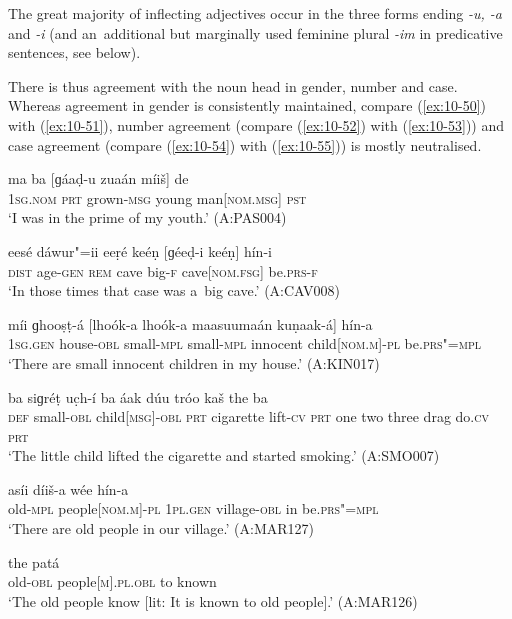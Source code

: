 The great majority of inflecting adjectives occur in the three forms ending \textit{-u, -a} and \textit{-i} (and an~additional but marginally used feminine plural \textit{-im} in predicative sentences, see  below).


There is thus agreement with the noun head in gender, number and case. Whereas agreement in gender is consistently maintained, compare (\ref{ex:10-50}) with (\ref{ex:10-51}), number agreement (compare (\ref{ex:10-52}) with (\ref{ex:10-53})) and case agreement (compare (\ref{ex:10-54}) with (\ref{ex:10-55})) is mostly neutralised. 

\begin{exe}
\ex
\label{ex:10-50}
\gll ma ba [ɡáaḍ-u zuaán míiš] de \\
\textsc{1sg.nom} \textsc{prt} grown-\textsc{msg} young man[\textsc{nom}.\textsc{msg}] \textsc{pst} \\
\glt `I was in the prime of my youth.' (A:PAS004)

\ex
\label{ex:10-51}
\gll eesé dáwur"=ii eeṛé keéṇ [ɡéeḍ-i keéṇ] hín-i \\
\textsc{dist} age-\textsc{gen} \textsc{rem} cave big-\textsc{f} cave[\textsc{nom}.\textsc{fsg}] be.\textsc{prs-f} \\
\glt `In those times that case was a~big cave.' (A:CAV008)

\ex
\label{ex:10-52}
\gll míi ɡhooṣṭ-á [lhoók-a lhoók-a maasuumaán kuṇaak-á] hín-a \\
\textsc{1sg.gen} house-\textsc{obl} small-\textsc{mpl} small-\textsc{mpl}  innocent child[\textsc{nom.m}]-\textsc{pl} be.\textsc{prs"=mpl}\\
\glt `There are small innocent children in my house.' (A:KIN017)

\ex
\label{ex:10-53}
 ba siɡréṭ uc̣h-í ba áak dúu tróo kaš the ba \\
\textsc{def} small-\textsc{obl} child[\textsc{msg}]-\textsc{obl} \textsc{prt} cigarette lift-\textsc{cv} \textsc{prt } one two three drag do.\textsc{cv} \textsc{prt}  \\
\glt `The little child lifted the cigarette and started smoking.' (A:SMO007)

\ex
\label{ex:10-54}
 asíi díiš-a wée hín-a \\
old-\textsc{mpl} people[\textsc{nom.m}]-\textsc{pl} \textsc{1pl.gen} village-\textsc{obl} in be.\textsc{prs"=mpl} \\
\glt `There are old people in our village.' (A:MAR127)

\ex
\label{ex:10-55}
 the patá \\
old-\textsc{obl} people[\textsc{m}].\textsc{pl.obl} to known \\
\glt `The old people know [lit: It is known to old people].' (A:MAR126)
\end{exe}


